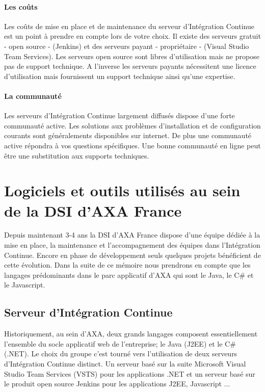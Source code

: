       \paragraph{Les coûts} Les coûts de mise en place et de maintenance du serveur d'Intégration Continue est un point à prendre en compte lors de votre choix. Il existe des serveurs gratuit - open source - (Jenkins) et des serveurs payant - propriétaire - (Visual Studio Team Services). Les serveurs open source sont libres d'utilisation mais ne propose pas de support technique. A l'inverse les serveurs payants nécessitent une licence d'utilisation mais fournissent un support technique ainsi qu'une expertise.

      \paragraph{La communauté} Les serveurs d'Intégration Continue largement diffusés dispose d'une forte communauté active. Les solutions aux problèmes d'installation et de configuration courants sont généralements disponibles sur internet. De plus une communauté active répondra à vos questions spécifiques. Une bonne communauté en ligne peut être une substitution aux supports techniques.

  \section{Logiciels et outils utilisés au sein de la DSI d'AXA France}
  Depuis maintenant 3-4 ans la DSI d'AXA France dispose d'une équipe dédiée à la mise en place, la maintenance et l'accompagnement des équipes dans l'Intégration Continue. Encore en phase de développement seuls quelques projets bénéficient de cette évolution. Dans la suite de ce mémoire nous prendrons en compte que les langages prédominants dans le parc applicatif d'AXA qui sont le Java, le C\# et le Javascript.

    \subsection{Serveur d’Intégration Continue}
    Historiquement, au sein d'AXA, deux grands langages composent essentiellement l'ensemble du socle applicatif web de l'entreprise; le Java (J2EE) et le C\# (.NET). Le choix du groupe c'est tourné vers l'utilisation de deux serveurs d'Intégration Continue distinct. Un serveur basé sur la suite Microsoft Visual Studio Team Services (VSTS) pour les applications .NET et un serveur basé sur le produit open source Jenkins pour les applications J2EE, Javascript ...\\

